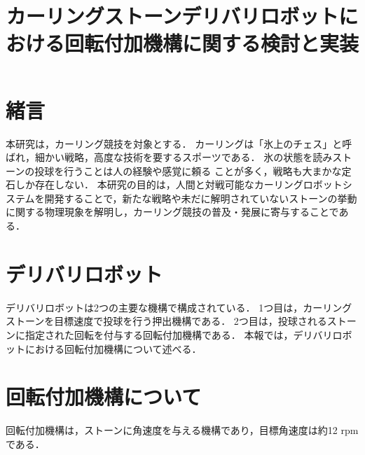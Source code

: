 \documentclass{classes/sice-si}
\title{カーリングストーンデリバリロボットにおける回転付加機構に関する検討と実装} %
\begin{document}


\maketitle

\section{緒言}
本研究は，カーリング競技を対象とする．
カーリングは「氷上のチェス」と呼ばれ，細かい戦略，高度な技術を要するスポーツである．
氷の状態を読みストーンの投球を行うことは人の経験や感覚に頼る
ことが多く，戦略も大まかな定石しか存在しない．
本研究の目的は，人間と対戦可能なカーリングロボットシステムを開発することで，新たな戦略や未だに解明されていないストーンの挙動に関する物理現象を解明し，カーリング競技の普及・発展に寄与することである．

\section{デリバリロボット}
デリバリロボットは2つの主要な機構で構成されている．
1つ目は，カーリングストーンを目標速度で投球を行う押出機構である．
2つ目は，投球されるストーンに指定された回転を付与する回転付加機構である．
本報では，デリバリロボットにおける回転付加機構について述べる．
\section{回転付加機構について}
回転付加機構は，ストーンに角速度を与える機構であり，目標角速度は約12 rpmである．
\end{document}

